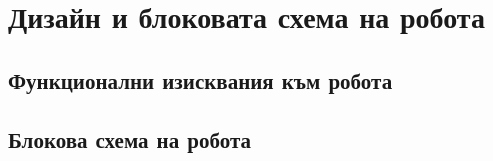 \chapter{Дизайн и блоковата схема на робота}

\section{Функционални изисквания към робота}

\section{Блокова схема на робота}